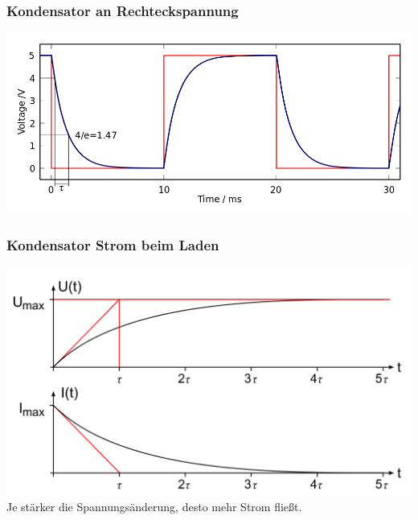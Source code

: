\begin{frame}
  \frametitle{Kondensator an Rechteckspannung}
  \begin{center}
    \includegraphics[width=1\textwidth,height=.85\textheight,keepaspectratio]{a03/Capacitor_Square_wave_charge-discharge.png}
    \tiny \hyperlink{refs}{\cite{wc}}
  \end{center}
\end{frame}

\begin{frame}
  \frametitle{Kondensator Strom beim Laden}
  \begin{center}
    \includegraphics[width=1\textwidth,height=.75\textheight,keepaspectratio]{a03/Ladevorgang.png}
    \tiny \hyperlink{refs}{\cite{wc}}\\
    \Large{Je stärker die Spannungsänderung, desto mehr Strom fließt.}
  \end{center}
\end{frame}

